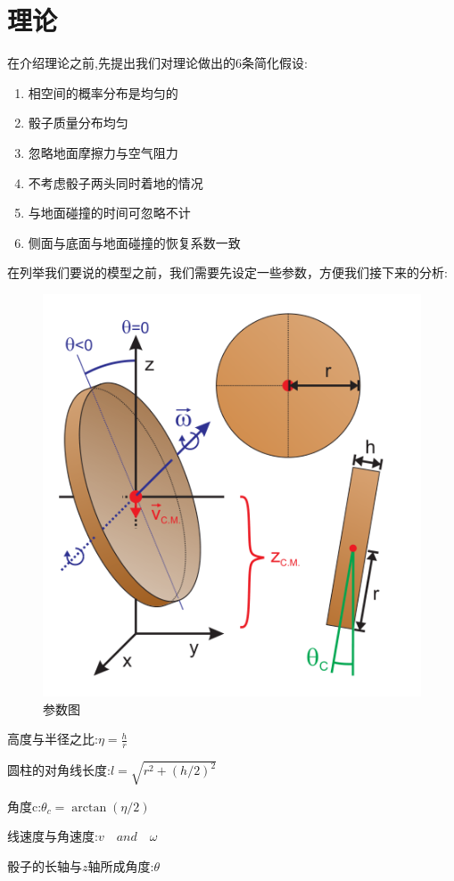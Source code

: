 \documentclass[UTF8]{gapd}
\begin{document}
\section{理论}
\label{sec:Theory}
在介绍理论之前,先提出我们对理论做出的6条简化假设:
\begin{enumerate}
	\item 相空间的概率分布是均匀的
	\item 骰子质量分布均匀
	\item 忽略地面摩擦力与空气阻力
	\item 不考虑骰子两头同时着地的情况
	\item 与地面碰撞的时间可忽略不计
	\item 侧面与底面与地面碰撞的恢复系数一致
\end{enumerate}
在列举我们要说的模型之前，我们需要先设定一些参数，方便我们接下来的分析:
\begin{figure}[h]%
	\centering
	\includegraphics[width=0.8\columnwidth]{images/骰子2}
	\caption{参数图\cite{c3}}
	\label{fig:P2}%
\end{figure}


高度与半径之比:\quad$\eta =\frac{h}{r}$

圆柱的对角线长度:\quad$l=\sqrt{r^2+(h/2)^2}$

角度c:\quad$\theta_{c}  = \arctan (\eta /2)$

线速度与角速度:\quad $v\quad and \quad\omega $

骰子的长轴与$z$轴所成角度:\quad$\theta$
\end{document}
